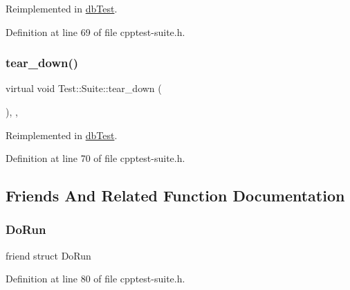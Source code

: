 Reimplemented in \mbox{\hyperlink{classdb_test_aeefb6e8d64ee6e03da89cb5573d60b31}{db\+Test}}.



Definition at line 69 of file cpptest-\/suite.\+h.

\mbox{\label{class_test_1_1_suite_a2f2f180307180f8fdb0ca718a12047d0}} 
\subsubsection{\texorpdfstring{tear\+\_\+down()}{tear\_down()}}
{\footnotesize\ttfamily virtual void Test\+::\+Suite\+::tear\+\_\+down (\begin{DoxyParamCaption}{ }\end{DoxyParamCaption})\hspace{0.3cm}{\ttfamily [inline]}, {\ttfamily [protected]}, {\ttfamily [virtual]}}



Reimplemented in \mbox{\hyperlink{classdb_test_a1fa8de6f80f7578356b0f8feb8dcdd8f}{db\+Test}}.



Definition at line 70 of file cpptest-\/suite.\+h.



\subsection{Friends And Related Function Documentation}
\mbox{\label{class_test_1_1_suite_a843435d7ee79d23ed13e6eec5c7ac6bb}} 
\subsubsection{\texorpdfstring{Do\+Run}{DoRun}}
{\footnotesize\ttfamily friend struct Do\+Run\hspace{0.3cm}{\ttfamily [friend]}}



Definition at line 80 of file cpptest-\/suite.\+h.

\mbox{\label{class_test_1_1_suite_ab4730d33c1241aba407b71f8eafb7bcc}} 
